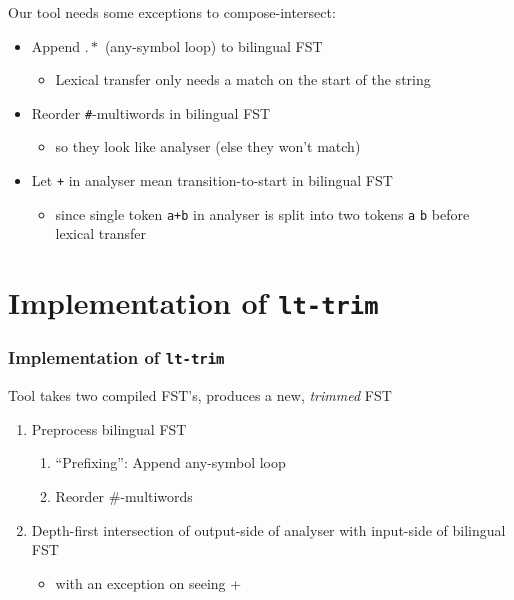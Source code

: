 \documentclass[notes=hide]{beamer}
\newcommand{\ana}[1]{\texttt{#1}}
\newcommand{\tool}[1]{\texttt{#1}}
\begin{document}
\begin{frame}
  Our tool needs some exceptions to compose-intersect:
  \begin{itemize}
  \item Append $.*$ (any-symbol loop) to bilingual FST
    \begin{itemize}
    \item Lexical transfer only needs a match on the start of the
      string
    \end{itemize}

  \item Reorder \ana{\#}-multiwords in bilingual FST
    \begin{itemize}
    \item so they look like analyser (else they won't match)
    \end{itemize}

  \item Let \ana{+} in analyser mean transition-to-start in bilingual
    FST
    \begin{itemize}
    \item since single token \ana{a+b} in analyser is split into two
      tokens \ana{a} \ana{b} before lexical transfer
    \end{itemize}

  \end{itemize}
\end{frame}

\section{Implementation of \tool{lt-trim}}
\begin{frame}
  \frametitle{Implementation of \tool{lt-trim}}
  Tool takes two compiled FST's, produces a new, \emph{trimmed} FST
  \begin{enumerate}
  \item Preprocess bilingual FST
    \begin{enumerate}
    \item ``Prefixing'': Append any-symbol loop
    \item Reorder \#-multiwords
    \end{enumerate}
  \item Depth-first intersection of output-side of analyser with
    input-side of bilingual FST
    \begin{itemize}
    \item with an exception on seeing +
    \end{itemize}
  \end{enumerate}
\end{frame}
\end{document}
